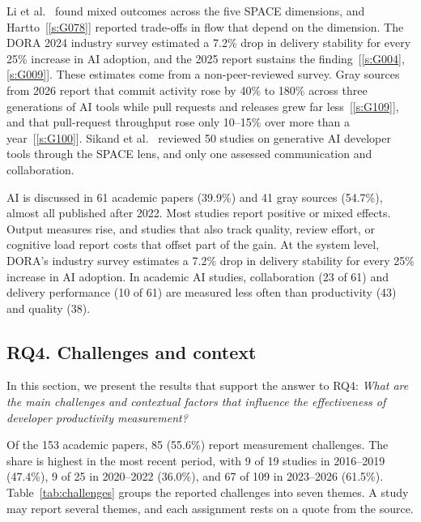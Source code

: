 \documentclass[preprint,number]{elsarticle}
\newcounter{study}
\newcommand{\refG}[1]{\ref{s:#1}}
\begin{document}
Li et al.~\cite{P1303} found mixed outcomes across the five SPACE dimensions, and Hartto~[\refG{G078}] reported trade-offs in flow that depend on the dimension. The DORA 2024 industry survey estimated a 7.2\% drop in delivery stability for every 25\% increase in AI adoption, and the 2025 report sustains the finding~[\refG{G004}, \refG{G009}]. These estimates come from a non-peer-reviewed survey. Gray sources from 2026 report that commit activity rose by 40\% to 180\% across three generations of AI tools while pull requests and releases grew far less~[\refG{G109}], and that pull-request throughput rose only 10--15\% over more than a year~[\refG{G100}]. Sikand et al.~\cite{P1816} reviewed 50 studies on generative AI developer tools through the SPACE lens, and only one assessed communication and collaboration.

\begin{tcolorbox}[colback=gray!5, colframe=gray!50, title={\textbf{Summary of RQ3}}, fonttitle=\small]
\footnotesize
AI is discussed in 61 academic papers (39.9\%) and 41 gray sources (54.7\%), almost all published after 2022. Most studies report positive or mixed effects. Output measures rise, and studies that also track quality, review effort, or cognitive load report costs that offset part of the gain. At the system level, DORA's industry survey estimates a 7.2\% drop in delivery stability for every 25\% increase in AI adoption. In academic AI studies, collaboration (23 of 61) and delivery performance (10 of 61) are measured less often than productivity (43) and quality (38).
\end{tcolorbox}

\subsection{RQ4. Challenges and context}
\label{sec:rq4}

In this section, we present the results that support the answer to RQ4: \textit{What are the main challenges and contextual factors that influence the effectiveness of developer productivity measurement?}

Of the 153 academic papers, 85 (55.6\%) report measurement challenges. The share is highest in the most recent period, with 9 of 19 studies in 2016--2019 (47.4\%), 9 of 25 in 2020--2022 (36.0\%), and 67 of 109 in 2023--2026 (61.5\%).
Table~\ref{tab:challenges} groups the reported challenges into seven themes. A study may report several themes, and each assignment rests on a quote from the source.
\end{document}

